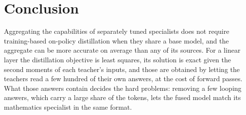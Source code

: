 \section{Conclusion}
\label{sec:conclusion}

Aggregating the capabilities of separately tuned specialists does not require
training-based on-policy distillation when they share a base model, and the
aggregate can be more accurate on average than any of its sources.
For a linear layer the distillation objective is least squares, its solution is
exact given the second moments of each teacher's inputs, and those are
obtained by letting the teachers read a few hundred of their own answers, at
the cost of forward passes. What those answers contain decides the hard
problems: removing a few looping answers, which carry a large share of the
tokens, lets the fused model match its mathematics specialist in the same
format.
